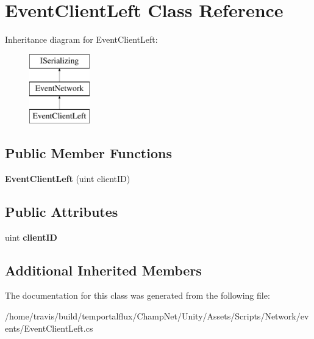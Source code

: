 \hypertarget{class_event_client_left}{\section{Event\-Client\-Left Class Reference}
\label{class_event_client_left}
}
Inheritance diagram for Event\-Client\-Left\-:\begin{figure}[H]
\begin{center}
\leavevmode
\includegraphics[height=3.000000cm]{class_event_client_left}
\end{center}
\end{figure}
\subsection*{Public Member Functions}
\begin{DoxyCompactItemize}
\item 
\hypertarget{class_event_client_left_a8e4abe7260a23d9993581f831c56ac06}{{\bfseries Event\-Client\-Left} (uint client\-I\-D)}\label{class_event_client_left_a8e4abe7260a23d9993581f831c56ac06}

\end{DoxyCompactItemize}
\subsection*{Public Attributes}
\begin{DoxyCompactItemize}
\item 
\hypertarget{class_event_client_left_a3b860c463fb45f8a4d31f5165cf2f5e9}{uint {\bfseries client\-I\-D}}\label{class_event_client_left_a3b860c463fb45f8a4d31f5165cf2f5e9}

\end{DoxyCompactItemize}
\subsection*{Additional Inherited Members}


The documentation for this class was generated from the following file\-:\begin{DoxyCompactItemize}
\item 
/home/travis/build/temportalflux/\-Champ\-Net/\-Unity/\-Assets/\-Scripts/\-Network/events/Event\-Client\-Left.\-cs\end{DoxyCompactItemize}
